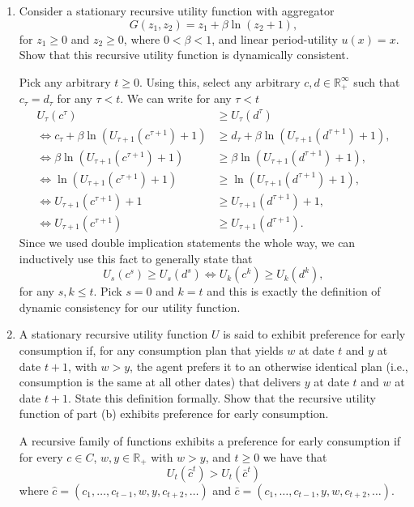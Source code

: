 \documentclass[11pt,english]{article}
\begin{document}
\begin{enumerate}[label = (\alph*)]
\begin{solution}
It is \textbf{dynamically consistent} if for every $t$, and $c,d\in \mathbb{R}^\infty_+$ such that $c_\tau = d_\tau$ for any $\tau < t$, $$U_0(c) \geq U_0(d)\Longleftrightarrow U_t(c^t) \geq U_t(d^t).$$
\end{solution}
    \item Consider a stationary recursive utility function with aggregator
    \[
    G(z_1, z_2) = z_1 + \beta \ln(z_2 + 1),
    \]
    for $z_1 \geq 0$ and $z_2 \geq 0$, where $0 < \beta < 1$, and linear period-utility $u(x) = x$. Show that this recursive utility function is dynamically consistent.
\begin{solution}
Pick any arbitrary $t\geq 0$. Using this, select any arbitrary $c,d\in \mathbb{R}^\infty_+$ such that $c_\tau = d_\tau$ for any $\tau < t$.
We can write for any $\tau < t$
\begin{align*}
U_\tau(c^\tau) &\geq U_\tau(d^\tau)\\
\Longleftrightarrow c_\tau + \beta \ln\left(U_{\tau+1}(c^{\tau+1}) + 1\right) &\geq d_{\tau} + \beta \ln\left(U_{{\tau+1}}(d^{\tau+1}) + 1\right),\\
\Longleftrightarrow \beta \ln\left(U_{\tau+1}(c^{\tau+1}) + 1\right) &\geq \beta \ln\left(U_{\tau+1}(d^{\tau+1}) + 1\right),\\
\Longleftrightarrow \ln\left(U_{\tau+1}(c^{\tau+1}) + 1\right) &\geq \ln\left(U_{\tau+1}(d^{\tau+1}) + 1\right),\\
\Longleftrightarrow U_{\tau+1}(c^{\tau+1}) + 1 &\geq U_{\tau+1}(d^{\tau+1}) + 1,\\
\Longleftrightarrow U_{\tau+1}(c^{\tau+1}) &\geq U_{\tau+1}(d^{\tau+1}).
\end{align*} Since we used double implication statements the whole way, we can inductively use this fact to generally state that $$U_s(c^s) \geq U_s(d^s) \Longleftrightarrow U_k(c^k) \geq U_k(d^k),$$ for any $s,k \leq t$. Pick $s = 0$ and $k = t$ and this is exactly the definition of dynamic consistency for our utility function.
\end{solution}
    \item A stationary recursive utility function $U$ is said to exhibit preference for early consumption if, for any consumption plan that yields $w$ at date $t$ and $y$ at date $t+1$, with $w > y$, the agent prefers it to an otherwise identical plan (i.e., consumption is the same at all other dates) that delivers $y$ at date $t$ and $w$ at date $t+1$. State this definition formally. Show that the recursive utility function of part (b) exhibits preference for early consumption.
\begin{solution}
A recursive family of functions exhibits a preference for early consumption if for every $c\in C$, $w,y\in \mathbb{R}_+$ with $w > y$, and $t \geq 0$ we have that $$U_t(\hat{c}^t) > U_t(\bar{c}^t)$$ where $\hat{c} = (c_1, \ldots, c_{t-1}, w, y, c_{t+2}, \ldots)$ and $\bar{c} = (c_1, \ldots, c_{t-1}, y,w, c_{t+2}, \ldots)$.


\end{solution}
\end{enumerate}
\end{document}
